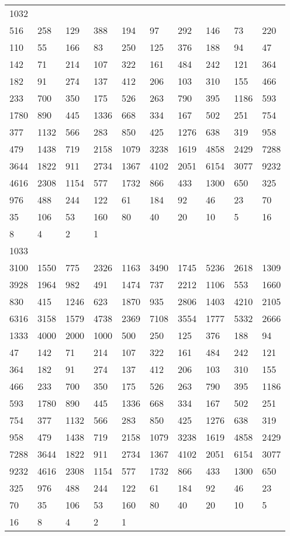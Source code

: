 \begin{longtable}{*{10}{l}}
1032&&&&&&&&&\\
516& 258& 129& 388& 194& 97& 292& 146& 73& 220\\
110& 55& 166& 83& 250& 125& 376& 188& 94& 47\\
142& 71& 214& 107& 322& 161& 484& 242& 121& 364\\
182& 91& 274& 137& 412& 206& 103& 310& 155& 466\\
233& 700& 350& 175& 526& 263& 790& 395& 1186& 593\\
1780& 890& 445& 1336& 668& 334& 167& 502& 251& 754\\
377& 1132& 566& 283& 850& 425& 1276& 638& 319& 958\\
479& 1438& 719& 2158& 1079& 3238& 1619& 4858& 2429& 7288\\
3644& 1822& 911& 2734& 1367& 4102& 2051& 6154& 3077& 9232\\
4616& 2308& 1154& 577& 1732& 866& 433& 1300& 650& 325\\
976& 488& 244& 122& 61& 184& 92& 46& 23& 70\\
35& 106& 53& 160& 80& 40& 20& 10& 5& 16\\
8& 4& 2& 1& \\

1033&&&&&&&&&\\
3100& 1550& 775& 2326& 1163& 3490& 1745& 5236& 2618& 1309\\
3928& 1964& 982& 491& 1474& 737& 2212& 1106& 553& 1660\\
830& 415& 1246& 623& 1870& 935& 2806& 1403& 4210& 2105\\
6316& 3158& 1579& 4738& 2369& 7108& 3554& 1777& 5332& 2666\\
1333& 4000& 2000& 1000& 500& 250& 125& 376& 188& 94\\
47& 142& 71& 214& 107& 322& 161& 484& 242& 121\\
364& 182& 91& 274& 137& 412& 206& 103& 310& 155\\
466& 233& 700& 350& 175& 526& 263& 790& 395& 1186\\
593& 1780& 890& 445& 1336& 668& 334& 167& 502& 251\\
754& 377& 1132& 566& 283& 850& 425& 1276& 638& 319\\
958& 479& 1438& 719& 2158& 1079& 3238& 1619& 4858& 2429\\
7288& 3644& 1822& 911& 2734& 1367& 4102& 2051& 6154& 3077\\
9232& 4616& 2308& 1154& 577& 1732& 866& 433& 1300& 650\\
325& 976& 488& 244& 122& 61& 184& 92& 46& 23\\
70& 35& 106& 53& 160& 80& 40& 20& 10& 5\\
16& 8& 4& 2& 1& \\


\end{longtable}
